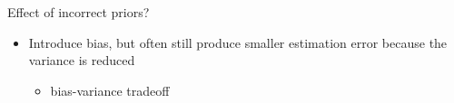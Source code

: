 \documentclass[english,t]{beamer}
\begin{document}




\begin{frame}{Effect of incorrect priors?}
  
  \begin{itemize}
  \item Introduce bias, but often still produce smaller estimation
    error because the variance is reduced
    \begin{itemize}
    \item bias-variance tradeoff
    \end{itemize}
  \end{itemize}  
  
\end{frame}
\end{document}

